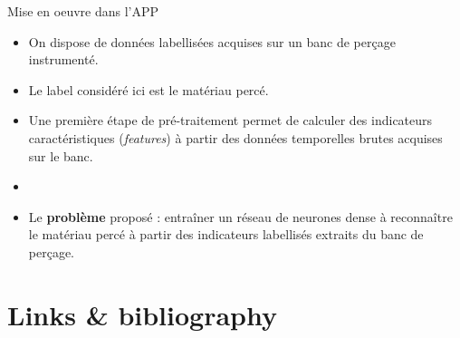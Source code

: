 \documentclass[10pt,serif,mathserif,compress,hyperref={colorlinks}]{beamer}
\begin{document}
\begin{frame}{Mise en oeuvre dans l'APP}

  \begin{tcolorbox}[title=Étape 2 -- Problème : classification des données \\
      \hspace*{20mm}d'un banc de perçage]
    \begin{itemize}
    \item On dispose de données labellisées acquises sur un banc de perçage instrumenté.
      \item Le label considéré ici est le matériau percé.
    \item Une première étape de pré-traitement permet de calculer des indicateurs caractéristiques 
      ({\em features}) à partir des données temporelles brutes acquises sur le banc.
    \item {}
    \item Le \textbf{problème} proposé : entraîner un réseau de neurones dense à reconnaître le matériau percé
      à partir des indicateurs labellisés extraits du banc de perçage.
    \end{itemize}
      
  \end{tcolorbox}

\end{frame}

\section{Links \& bibliography}
\end{document}
